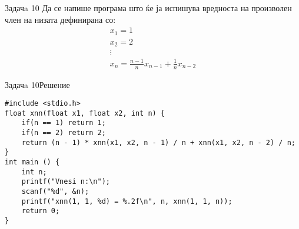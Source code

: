 \begin{frame}{Задачa 10}
Да се напише програма што ќе ја испишува вредноста на произволен член на
низата дефинирана со:
\[
   \begin{array}{l}
   x_1 = 1\\
   x_2 = 2\\ 
   \vdots\\
   x_n = \frac{n - 1}{n}x_{n - 1} + \frac{1}{n}x_{n - 2}
   \end{array}
\]
\end{frame}


\begin{frame}[fragile]{Задачa 10}{Решение}
\begin{lstlisting}
#include <stdio.h>
float xnn(float x1, float x2, int n) {
    if(n == 1) return 1;
    if(n == 2) return 2;
    return (n - 1) * xnn(x1, x2, n - 1) / n + xnn(x1, x2, n - 2) / n;
}
int main () {
    int n;
    printf("Vnesi n:\n");
    scanf("%d", &n);
    printf("xnn(1, 1, %d) = %.2f\n", n, xnn(1, 1, n));
    return 0;
}
\end{lstlisting}
\end{frame}
